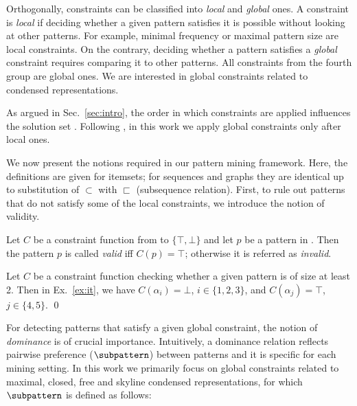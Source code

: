 Orthogonally, constraints can be classified into \emph{local} and \emph{global} ones.  
A constraint is \emph{local} if deciding whether a given pattern satisfies it is possible without looking at other patterns. For example, minimal frequency or maximal pattern %
size are local constraints. On the contrary, deciding whether a pattern satisfies a \emph{global} constraint requires comparing it to other patterns. All constraints from the fourth group are global ones. We are interested in global constraints related to condensed representations. 

As argued in Sec.~\ref{sec:intro}, the order in which constraints are applied influences the solution set \parencite{DBLP:journals/kais/BonchiL06}. %
Following \textcite{DBLP:journals/kais/BonchiL06}, in this work we %
apply %
global constraints only after local ones.

We now present the notions required in our pattern mining framework. Here, the definitions are given for itemsets; for sequences and graphs they are identical up to substitution of $\subset$ with $\sqsubset$ (subsequence relation). First, to rule out patterns that do not satisfy some of the local constraints, we introduce the notion of validity.

\begin{definition}\label{def:val}
    Let $C$ be a constraint function  from \patternspace to $\{ \top, \bot \}$ and let $p$ be a pattern in \patternspace. Then the pattern $p$ is called \emph{valid} iff $C(p) = \top$; otherwise it is referred  as \emph{invalid}.
\end{definition}


\begin{example}\label{ex:valid}
    Let $C$ be a constraint function checking whether a given pattern is of size %
    at least 2. Then in Ex.~\ref{ex:it}, we have $C(\alpha_i)=\bot$, $i\in\{1,2,3\}$, and $C(\alpha_j)=\top$, $j\in\{4,5\}$. \qed
\end{example}

For detecting patterns that satisfy a given global constraint, the notion of \emph{dominance} is of crucial importance. Intuitively, a dominance relation reflects pairwise preference ($\subpattern$)
between patterns and it is specific for each mining setting.  In this work we primarily focus on global constraints related to maximal, closed, free and skyline condensed representations, for which $\subpattern$ is defined as follows:

